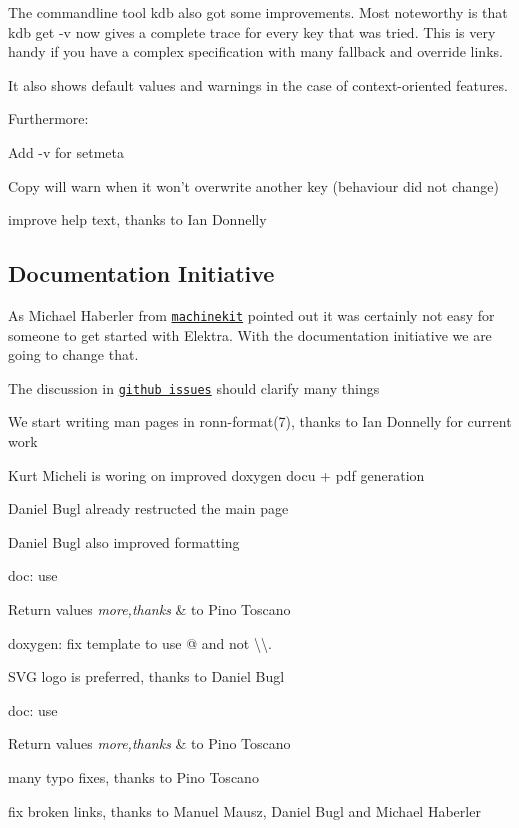 The commandline tool {\ttfamily kdb} also got some improvements. Most noteworthy is that {\ttfamily kdb get -\/v} now gives a complete trace for every key that was tried. This is very handy if you have a complex specification with many fallback and override links.

It also shows default values and warnings in the case of context-\/oriented features.

Furthermore\+:


\begin{DoxyItemize}
\item Add {\ttfamily -\/v} for setmeta
\item Copy will warn when it won't overwrite another key (behaviour did not change)
\item improve help text, thanks to Ian Donnelly
\end{DoxyItemize}

\subsection*{Documentation Initiative}

As Michael Haberler from \href{http://www.machinekit.io/}{\tt machinekit} pointed out it was certainly not easy for someone to get started with Elektra. With the documentation initiative we are going to change that.


\begin{DoxyItemize}
\item The discussion in \href{http://git.libelektra.org/issues}{\tt github issues} should clarify many things
\item We start writing man pages in ronn-\/format(7), thanks to Ian Donnelly for current work
\item Kurt Micheli is woring on improved doxygen docu + pdf generation
\item Daniel Bugl already restructed the main page
\item Daniel Bugl also improved formatting
\item doc\+: use 
\begin{DoxyRetVals}{Return values}
{\em more,thanks} & to Pino Toscano\\
\hline
\end{DoxyRetVals}

\item doxygen\+: fix template to use {\ttfamily @} and not {\ttfamily \textbackslash{}\textbackslash{}}.
\item S\+V\+G logo is preferred, thanks to Daniel Bugl
\item doc\+: use 
\begin{DoxyRetVals}{Return values}
{\em more,thanks} & to Pino Toscano\\
\hline
\end{DoxyRetVals}

\item many typo fixes, thanks to Pino Toscano
\item fix broken links, thanks to Manuel Mausz, Daniel Bugl and Michael Haberler
\end{DoxyItemize}

